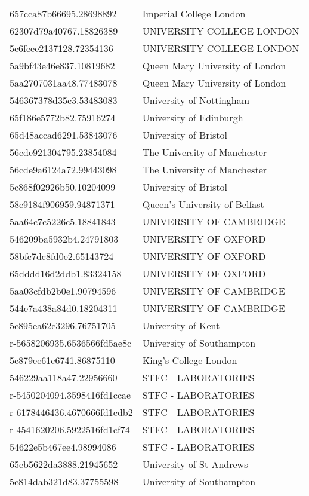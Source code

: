 \begin{tabular}{ll}
657cca87b66695.28698892 & Imperial College London \\
62307d79a40767.18826389 & UNIVERSITY COLLEGE LONDON \\
5c6feee2137128.72354136 & UNIVERSITY COLLEGE LONDON \\
5a9bf43e46e837.10819682 & Queen Mary University of London \\
5aa2707031aa48.77483078 & Queen Mary University of London \\
546367378d35c3.53483083 & University of Nottingham \\
65f186e5772b82.75916274 & University of Edinburgh \\
65d48accad6291.53843076 & University of Bristol \\
56cde921304795.23854084 & The University of Manchester \\
56cde9a6124a72.99443098 & The University of Manchester \\
5c868f02926b50.10204099 & University of Bristol \\
58c9184f906959.94871371 & Queen's University of Belfast \\
5aa64c7c5226c5.18841843 & UNIVERSITY OF CAMBRIDGE \\
546209ba5932b4.24791803 & UNIVERSITY OF OXFORD \\
58bfc7dc8fd0e2.65143724 & UNIVERSITY OF OXFORD \\
65dddd16d2ddb1.83324158 & UNIVERSITY OF OXFORD \\
5aa03cfdb2b0e1.90794596 & UNIVERSITY OF CAMBRIDGE \\
544e7a438a84d0.18204311 & UNIVERSITY OF CAMBRIDGE \\
5c895ea62c3296.76751705 & University of Kent \\
r-5658206935.6536566fd5ae8c & University of Southampton \\
5c879ee61c6741.86875110 & King's College London \\
546229aa118a47.22956660 & STFC - LABORATORIES \\
r-5450204094.3598416fd1ccae & STFC - LABORATORIES \\
r-6178446436.4670666fd1cdb2 & STFC - LABORATORIES \\
r-4541620206.5922516fd1cf74 & STFC - LABORATORIES \\
54622e5b467ee4.98994086 & STFC - LABORATORIES \\
65eb5622da3888.21945652 & University of St Andrews \\
5c814dab321d83.37755598 & University of Southampton \\

\end{tabular}
